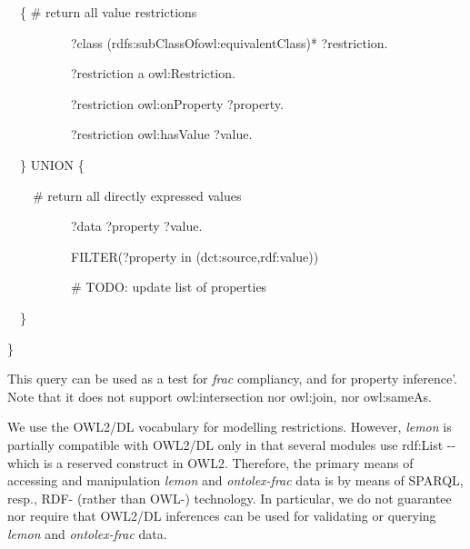 \documentclass[a4paper]{article}
\newcommand\textstyleEmphasis[1]{\textit{#1}}
\newcommand\textstyleSourceText[1]{\textrm{#1}}
\newcommand\textstyleTeletype[1]{\textrm{#1}}
\begin{document}
\textstyleSourceText{\ \ \{ \# return all value restrictions}

\textstyleSourceText{\ \ \ \ \ \ \ \ \ \ ?class (rdfs:subClassOf{\textbar}owl:equivalentClass)* ?restriction.}

\textstyleSourceText{\ \ \ \ \ \ \ \ \ \ ?restriction a owl:Restriction.}

\textstyleSourceText{\ \ \ \ \ \ \ \ \ \ ?restriction owl:onProperty ?property.}

\textstyleSourceText{\ \ \ \ \ \ \ \ \ \ ?restriction owl:hasValue ?value.}

\textstyleSourceText{\ \ \} UNION \{}

\textstyleSourceText{\ \ \ \ \# return all directly expressed values}

\textstyleSourceText{\ \ \ \ \ \ \ \ \ \ ?data ?property ?value.}

\textstyleSourceText{\ \ \ \ \ \ \ \ \ \ FILTER(?property in (dct:source,rdf:value))}

\textstyleSourceText{\ \ \ \ \ \ \ \ \ \ \# TODO: update list of properties}

\textstyleSourceText{\ \ \}}

\textstyleSourceText{\}}

This query can be used as a test for \textstyleEmphasis{frac} compliancy, and for property {\textasciigrave}inference'. Note that it does not support \textstyleTeletype{owl:intersection} nor \textstyleTeletype{owl:join}, nor \textstyleTeletype{owl:sameAs}.

We use the OWL2/DL vocabulary for modelling restrictions. However, \textstyleEmphasis{lemon} is partially compatible with OWL2/DL only in that several modules use \textstyleTeletype{rdf:List} -{}- which is a reserved construct in OWL2. Therefore, the primary means of accessing and manipulation \textstyleEmphasis{lemon} and \textstyleEmphasis{ontolex-frac} data is by means of SPARQL, resp., RDF- (rather than OWL-) technology. In particular, we do not guarantee nor require that OWL2/DL inferences can be used for validating or querying \textstyleEmphasis{lemon} and \textstyleEmphasis{ontolex-frac} data. 
\end{document}
